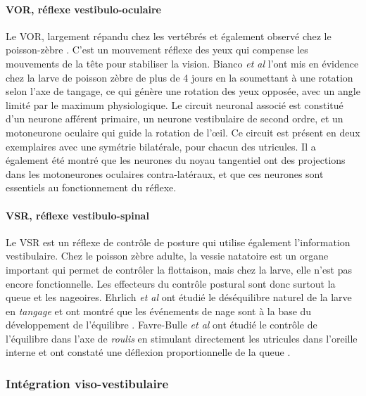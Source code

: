 \paragraph{VOR, réflexe vestibulo-oculaire} \label{VOR}
Le VOR, largement répandu chez les vertébrés et également observé chez le poisson-zèbre \cite{bianco_tangential_2012}. C'est un mouvement réflexe des yeux qui compense les mouvements de la tête pour stabiliser la vision. Bianco \emph{et al} l'ont mis en évidence chez la larve de poisson zèbre de plus de 4 jours en la soumettant à une rotation selon l'axe de tangage, ce qui génère une rotation des yeux opposée, avec un angle limité par le maximum physiologique. Le circuit neuronal associé est constitué d'un neurone afférent primaire, un neurone vestibulaire de second ordre, et un motoneurone oculaire qui guide la rotation de l’œil. Ce circuit est présent en deux exemplaires avec une symétrie bilatérale, pour chacun des utricules. Il a également été montré que les neurones du noyau tangentiel ont des projections dans les motoneurones oculaires contra-latéraux, et que ces neurones sont essentiels au fonctionnement du réflexe. 

\paragraph{VSR, réflexe vestibulo-spinal} \label{VSR}
Le VSR est un réflexe de contrôle de posture qui utilise également l'information vestibulaire. Chez le poisson zèbre adulte, la vessie natatoire est un organe important qui permet de contrôler la flottaison, mais chez la larve, elle n'est pas encore fonctionnelle. Les effecteurs du contrôle postural sont donc surtout la queue et les nageoires. Ehrlich \emph{et al} ont étudié le déséquilibre naturel de la larve en \emph{tangage} et ont montré que les événements de nage sont à la base du développement de l'équilibre \cite{ehrlich_control_2017}. Favre-Bulle \emph{et al} ont étudié le contrôle de l'équilibre dans l'axe de \emph{roulis} en stimulant directement les utricules dans l'oreille interne et ont constaté une déflexion proportionnelle de la queue \cite{favre-bulle_cellular-resolution_2018}.

\subsubsection{Intégration viso-vestibulaire}

